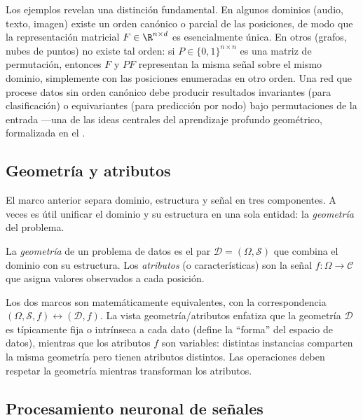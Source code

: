 \begin{remark}
\label{rem:found:permutation}
Los ejemplos revelan una distinci\'on fundamental. En algunos dominios (audio,
texto, imagen) existe un orden can\'onico o parcial de las posiciones, de modo que
la representaci\'on matricial $F \in \R^{n \times d}$ es esencialmente \'unica. En
otros (grafos, nubes de puntos) no existe tal orden: si $P \in \{0,1\}^{n \times
n}$ es una matriz de permutaci\'on, entonces $F$ y $PF$ representan la misma se\~nal
sobre el mismo dominio, simplemente con las posiciones enumeradas en otro orden.
Una red que procese datos sin orden can\'onico debe producir resultados invariantes
(para clasificaci\'on) o equivariantes (para predicci\'on por nodo) bajo
permutaciones de la entrada ---una de las ideas centrales del aprendizaje profundo
geom\'etrico, formalizada en el .
\end{remark}

\subsection{Geometr\'ia y atributos}
\label{sec:found:geometry-attributes}

El marco anterior separa dominio, estructura y se\~nal en tres componentes. A veces
es \'util unificar el dominio y su estructura en una sola entidad: la
\emph{geometr\'ia} del problema.

\begin{definition}
\label{def:found:geometry}
La \emph{geometr\'ia} de un problema de datos es el par $\mathcal{D} = (\Omega,
\mathcal{S})$ que combina el dominio con su estructura. Los \emph{atributos} (o
caracter\'isticas) son la se\~nal $f : \Omega \to \mathcal{C}$ que asigna valores
observados a cada posici\'on.
\end{definition}

Los dos marcos son matem\'aticamente equivalentes, con la correspondencia
$(\Omega, \mathcal{S}, f) \leftrightarrow (\mathcal{D}, f)$. La vista
geometr\'ia/atributos enfatiza que la geometr\'ia $\mathcal{D}$ es t\'ipicamente
fija o intr\'inseca a cada dato (define la ``forma'' del espacio de datos),
mientras que los atributos $f$ son variables: distintas instancias comparten la
misma geometr\'ia pero tienen atributos distintos. Las operaciones deben respetar
la geometr\'ia mientras transforman los atributos.

\subsection{Procesamiento neuronal de se\~nales}
\label{sec:found:neuron-as-operator}

